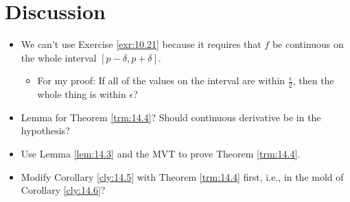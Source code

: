 \documentclass{report}
\begin{document}



\section{Discussion}
\begin{itemize}
    \item {}We can't use Exercise \ref{exr:10.21} because it requires that $f$ be continuous on the whole interval $[p-\delta,p+\delta]$.
    \begin{itemize}
        \item For my proof: If all of the values on the interval are within $\frac{\epsilon}{2}$, then the whole thing is within $\epsilon$?
    \end{itemize}
    \item {}Lemma for Theorem \ref{trm:14.4}? Should continuous derivative be in the hypothesis?
    \item Use Lemma \ref{lem:14.3} and the MVT to prove Theorem \ref{trm:14.4}.
    \item Modify Corollary \ref{cly:14.5} with Theorem \ref{trm:14.4} first, i.e., in the mold of Corollary \ref{cly:14.6}?
\end{itemize}




\end{document}
